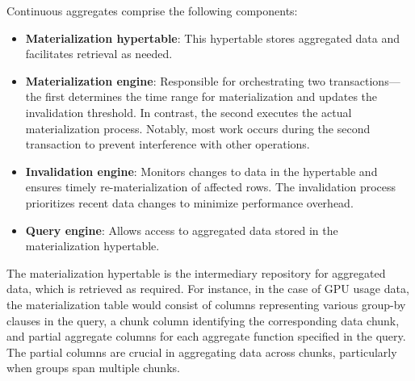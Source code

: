 Continuous aggregates comprise the following components:

\begin{itemize}
    \item \textbf{Materialization hypertable}: This hypertable stores aggregated data and facilitates retrieval as needed.

    \item \textbf{Materialization engine}: Responsible for orchestrating two transactions— the first determines the time range for materialization and updates the invalidation threshold. In contrast, the second executes the actual materialization process. Notably, most work occurs during the second transaction to prevent interference with other operations.

    \item \textbf{Invalidation engine}: Monitors changes to data in the hypertable and ensures timely re-materialization of affected rows. The invalidation process prioritizes recent data changes to minimize performance overhead.

    \item \textbf{Query engine}: Allows access to aggregated data stored in the materialization hypertable.
\end{itemize}

The materialization hypertable is the intermediary repository for aggregated data, which is retrieved as required. For instance, in the case of GPU usage data, the materialization table would consist of columns representing various group-by clauses in the query, a chunk column identifying the corresponding data chunk, and partial aggregate columns for each aggregate function specified in the query. The partial columns are crucial in aggregating data across chunks, particularly when groups span multiple chunks.



